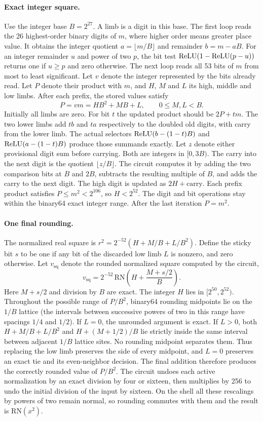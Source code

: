 \paragraph{Exact integer square.}
Use the integer base $B=2^{27}$. A limb is a digit in this base. The first loop reads the 26 highest-order binary digits of $m$, where higher order means greater place value. It obtains the integer quotient $a=\lfloor m/B\rfloor$ and remainder $b=m-aB$. For an integer remainder $u$ and power of two $p$, the bit test $\operatorname{ReLU}(1-\operatorname{ReLU}(p-u))$ returns one if $u\ge p$ and zero otherwise. The next loop reads all 53 bits of $m$ from most to least significant. Let $v$ denote the integer represented by the bits already read. Let $P$ denote their product with $m$, and $H$, $M$ and $L$ its high, middle and low limbs. After each prefix, the stored values satisfy
\[
 P=vm=H B^2+M B+L,\qquad 0\le M,L<B .
\]
Initially all limbs are zero. For bit $t$ the updated product should be $2P+tm$. The two lower limbs add $tb$ and $ta$ respectively to the doubled old digits, with carry from the lower limb. The actual selectors $\operatorname{ReLU}(b-(1-t)B)$ and $\operatorname{ReLU}(a-(1-t)B)$ produce those summands exactly. Let $z$ denote either provisional digit sum before carrying. Both are integers in $[0,3B)$. The carry into the next digit is the quotient $\lfloor z/B\rfloor$. The circuit computes it by adding the two comparison bits at $B$ and $2B$, subtracts the resulting multiple of $B$, and adds the carry to the next digit. The high digit is updated as $2H+\mathrm{carry}$. Each prefix product satisfies $P\le m^2<2^{106}$, so $H<2^{52}$. The digit and bit operations stay within the binary64 exact integer range. After the last iteration $P=m^2$.

\paragraph{One final rounding.}
The normalized real square is $r^2=2^{-52}(H+M/B+L/B^2)$. Define the sticky bit $s$ to be one if any bit of the discarded low limb $L$ is nonzero, and zero otherwise. Let $v_{\mathrm{sq}}$ denote the rounded normalized square computed by the circuit,
\[
 v_{\mathrm{sq}}=2^{-52}\,\mathrm{RN}\!\left(H+\frac{M+s/2}{B}\right).
\]
Here $M+s/2$ and division by $B$ are exact. The integer $H$ lies in $[2^{50},2^{52})$. Throughout the possible range of $P/B^2$, binary64 rounding midpoints lie on the $1/B$ lattice (the intervals between successive powers of two in this range have spacings $1/4$ and $1/2$). If $L=0$, the unrounded argument is exact. If $L>0$, both $H+M/B+L/B^2$ and $H+(M+1/2)/B$ lie strictly inside the same interval between adjacent $1/B$ lattice sites. No rounding midpoint separates them. Thus replacing the low limb preserves the side of every midpoint, and $L=0$ preserves an exact tie and its even-neighbor decision. The final addition therefore produces the correctly rounded value of $P/B^2$. The circuit undoes each active normalization by an exact division by four or sixteen, then multiplies by 256 to undo the initial division of the input by sixteen. On the shell all these rescalings by powers of two remain normal, so rounding commutes with them and the result is $\mathrm{RN}(x^2)$.

